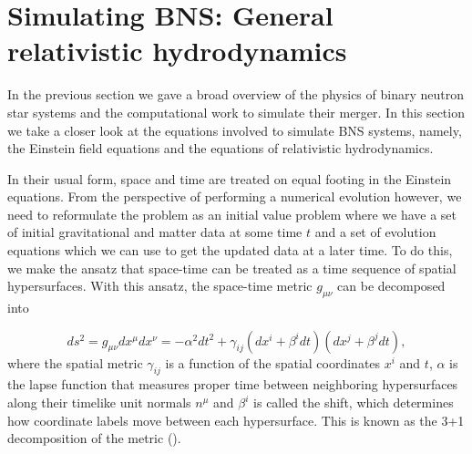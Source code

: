 


\section{Simulating BNS: General relativistic hydrodynamics}

In the previous section we gave a broad overview of the physics of binary neutron star systems and the computational work to simulate their merger. In this section we take a closer look at the equations involved to simulate BNS systems, namely, the Einstein field equations and the equations of relativistic hydrodynamics.

In their usual form, space and time are treated on equal footing in the Einstein equations. From the perspective of performing a numerical evolution however, we need to reformulate the problem as an initial value problem where we have a set of initial gravitational and matter data at some time $t$ and a set of evolution equations which we can use to get the updated data at a later time. To do this, we make the ansatz that space-time can be treated as a time sequence of spatial hypersurfaces. With this ansatz, the space-time metric $g_{\mu\nu}$ can be decomposed into

\begin{equation}
\label{eq:4}
ds^{2} = g_{\mu\nu}dx^{\mu}dx^{\nu} = -\alpha^2dt^2 + \gamma_{ij}(dx^i+\beta^idt)(dx^j+\beta^jdt),
\end{equation}
%
where the spatial metric $\gamma_{ij}$ is a function of the spatial coordinates $x^{i}$ and $t$, $\alpha$ is the lapse function that measures proper time between neighboring hypersurfaces along their timelike unit normals $n^{\mu}$ and $\beta^i$ is called the shift, which determines how coordinate labels move between each hypersurface. This is known as the 3+1 decomposition of the metric (\cite{arnowitt1959dynamical}).

